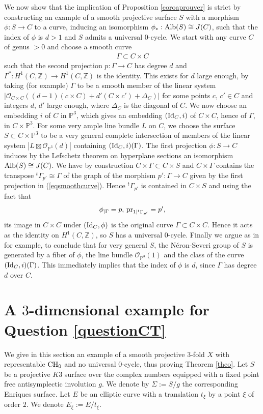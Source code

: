 \documentclass[10pt]{article}
\begin{document}
We now show that the implication of Proposition \ref{coroaprouver} is strict by constructing  an example of a smooth projective surface $S$ with a morphism $\phi:S\rightarrow C$ to a curve, inducing an isomorphism $\phi_*:{\rm Alb}(S)\cong J(C)$, such that the index of $\phi$ is $d>1$ and $S$ admits a universal $0$-cycle. We start with any curve $C$ of genus $>0$  and choose a smooth curve \begin{eqnarray}
\label{eqsmoothcurve} \Gamma \subset C\times C
\end{eqnarray}
 such that the second projection $p:\Gamma\rightarrow C$ has degree $d$ and $\Gamma^*:H^1(C,\mathbb{Z})\rightarrow H^1(C,\mathbb{Z})$ is the identity. This exists for $d$ large enough, by taking (for example) $\Gamma$ to be a smooth member of the linear system
$|\mathcal{O}_{C\times C}((d-1)(c\times C)+d' (C\times c')+\Delta_C)|$ for some points $c,\,c'\in C$ and integers $d,\,d'$ large enough, where $\Delta_C$ is the diagonal of $C$.
We now choose an embedding $i$ of  $C$ in $\mathbb{P}^3$, which gives an embedding $({\rm Id}_C,i)$ of $C\times C$, hence of $\Gamma$, in $C\times \mathbb{P}^3$. For some very ample line bundle $L$ on $C$, we choose the surface $S\subset C\times \mathbb{P}^3$ to be a very general complete intersection of members of the linear system $|L\boxtimes \mathcal{O}_{\mathbb{P}^3}(d)|$ containing $({\rm Id}_C,i)(\Gamma)$.  The first projection $\phi:S\rightarrow C$ induces by the Lefschetz theorem on hyperplane sections an isomorphism
${\rm Alb}(S)\cong J(C)$. We have by construction $C\times \Gamma\subset C\times S$ and $C\times \Gamma$ contains the transpose  ${^t\Gamma}_{p'}\cong \Gamma$ of the graph of the morphism $p':\Gamma\rightarrow C$ given by the first projection in (\ref{eqsmoothcurve}). Hence  ${^t\Gamma}_{p'}$ is contained in $C\times S$ and using the fact that
$$\phi_{\mid \Gamma}=p,\,{\rm pr}_{1\mid {^t\Gamma}_{p'}}=p',$$  its image in $C\times C$ under $({\rm Id}_C,\phi)$ is the original curve $\Gamma\subset C\times C$. Hence it acts as the identity on $H^1(C,\mathbb{Z})$, so $S$ has a universal $0$-cycle.
Finally we argue as in \cite{lopez} for example, to conclude that for very general $S$, the N\'{e}ron-Severi group of $S$ is generated by a fiber of $\phi$, the line bundle $\mathcal{O}_{\mathbb{P}^3}(1)$ and the class of the curve $({\rm Id}_C,i)(\Gamma)$.
This immediately implies that the index of $\phi$ is $d$, since $\Gamma$ has degree $d$ over $C$.
\section{A $3$-dimensional  example for Question \ref{questionCT}\label{secexCT}}
We give in this section an example of a smooth projective $3$-fold $X$ with representable ${\rm CH}_0$ and no universal $0$-cycle, thus proving Theorem \ref{theo}.
Let $S$ be a projective $K3$ surface over the complex numbers  equipped with a fixed point free antisymplectic involution $g$. We denote by $\Sigma:=S/g$ the corresponding Enriques surface.
 Let $E$ be an elliptic curve with a translation $t_\xi$ by a point $\xi$ of order $2$. We denote $E_\xi:=E/t_\xi$.
\end{document}
